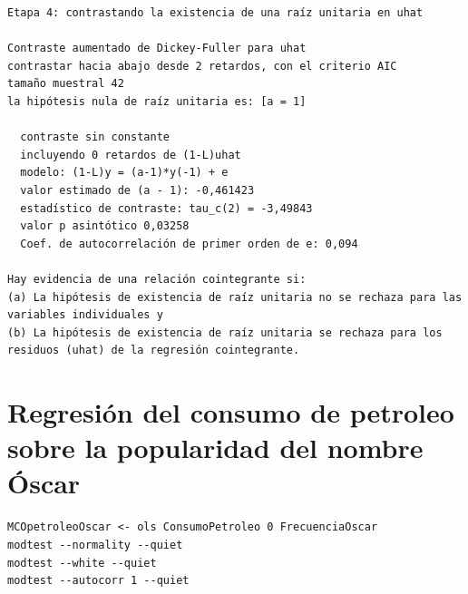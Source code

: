 \documentclass[10pt]{article}
\begin{document}
\begin{verbatim}
Etapa 4: contrastando la existencia de una raíz unitaria en uhat

Contraste aumentado de Dickey-Fuller para uhat
contrastar hacia abajo desde 2 retardos, con el criterio AIC
tamaño muestral 42
la hipótesis nula de raíz unitaria es: [a = 1]

  contraste sin constante 
  incluyendo 0 retardos de (1-L)uhat
  modelo: (1-L)y = (a-1)*y(-1) + e
  valor estimado de (a - 1): -0,461423
  estadístico de contraste: tau_c(2) = -3,49843
  valor p asintótico 0,03258
  Coef. de autocorrelación de primer orden de e: 0,094

Hay evidencia de una relación cointegrante si:
(a) La hipótesis de existencia de raíz unitaria no se rechaza para las variables individuales y
(b) La hipótesis de existencia de raíz unitaria se rechaza para los residuos (uhat) de la regresión cointegrante.
\end{verbatim}
\section*{Regresión del consumo de petroleo sobre la popularidad del nombre Óscar}
\label{sec:orgd830702}

\begin{verbatim}
MCOpetroleoOscar <- ols ConsumoPetroleo 0 FrecuenciaOscar
modtest --normality --quiet
modtest --white --quiet
modtest --autocorr 1 --quiet
\end{verbatim}
\end{document}
